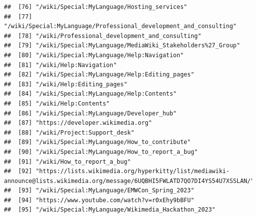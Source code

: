 \documentclass[
]{article}
\begin{document}
\begin{verbatim}
##  [76] "/wiki/Special:MyLanguage/Hosting_services"                                                                                   
##  [77] "/wiki/Special:MyLanguage/Professional_development_and_consulting"                                                            
##  [78] "/wiki/Professional_development_and_consulting"                                                                               
##  [79] "/wiki/Special:MyLanguage/MediaWiki_Stakeholders%27_Group"                                                                    
##  [80] "/wiki/Special:MyLanguage/Help:Navigation"                                                                                    
##  [81] "/wiki/Help:Navigation"                                                                                                       
##  [82] "/wiki/Special:MyLanguage/Help:Editing_pages"                                                                                 
##  [83] "/wiki/Help:Editing_pages"                                                                                                    
##  [84] "/wiki/Special:MyLanguage/Help:Contents"                                                                                      
##  [85] "/wiki/Help:Contents"                                                                                                         
##  [86] "/wiki/Special:MyLanguage/Developer_hub"                                                                                      
##  [87] "https://developer.wikimedia.org"                                                                                             
##  [88] "/wiki/Project:Support_desk"                                                                                                  
##  [89] "/wiki/Special:MyLanguage/How_to_contribute"                                                                                  
##  [90] "/wiki/Special:MyLanguage/How_to_report_a_bug"                                                                                
##  [91] "/wiki/How_to_report_a_bug"                                                                                                   
##  [92] "https://lists.wikimedia.org/hyperkitty/list/mediawiki-announce@lists.wikimedia.org/message/6UQBHI5FWLATD7QO7DI4YS54U7XSSLAN/"
##  [93] "/wiki/Special:MyLanguage/EMWCon_Spring_2023"                                                                                 
##  [94] "https://www.youtube.com/watch?v=r0xEhy9bBFU"                                                                                 
##  [95] "/wiki/Special:MyLanguage/Wikimedia_Hackathon_2023"                                                                           

\end{verbatim}
\end{document}
